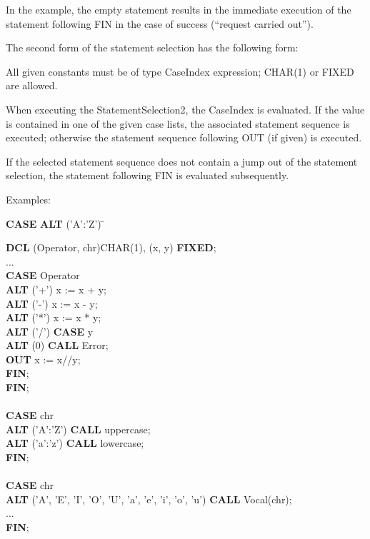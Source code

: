 In the example, the empty statement results in the immediate execution
of the statement following FIN in the case of success (``request carried
out'').


The second form of the statement selection has the following form:








All given constants must be of type CaseIndex expression; CHAR(1) or
FIXED are allowed.

When executing the StatementSelection2, the CaseIndex is evaluated.
If the value is contained in one of the given case lists, the associated
statement sequence is executed; otherwise the statement sequence
following OUT (if given) is executed.

If the selected statement sequence does not contain a jump out of the
statement selection, the statement following FIN is evaluated
subsequently.

Examples:

\begin{tabbing}
{\bf CASE} \= {\bf ALT} ('A':'Z') \= \kill

{\bf DCL}  \> (Operator, chr)CHAR(1), (x, y) {\bf FIXED}; \> \\
...        \> \> \\
{\bf CASE} \> Operator \> \\
    \> {\bf ALT} ('+')    \> x := x + y; \\
    \> {\bf ALT} ('-')    \> x := x - y; \\
    \> {\bf ALT} ('*')    \> x := x * y; \\
    \> {\bf ALT} ('/')    \> {\bf CASE} y \\
    \>                    \> {\bf ALT} (0) {\bf CALL} Error;\\
    \>                    \> {\bf OUT} x := x//y;\\
    \>                    \> {\bf FIN};\\
{\bf FIN}; \> \> \\
    \> \> \\
{\bf CASE} \> chr \> \\
    \> {\bf ALT} ('A':'Z') \> {\bf CALL} uppercase;\\
    \> {\bf ALT} ('a':'z') \> {\bf CALL} lowercase;\\
{\bf FIN}; \> \> \\
    \> \> \\
{\bf CASE} \> chr \> \\
    \> {\bf ALT} ('A', 'E', 'I', 'O', 'U', 'a', 'e', 'i', 'o', 'u') {\bf CALL} Vocal(chr); \> \\
    \> ... \> \\
{\bf FIN}; \> \>
\end{tabbing}

